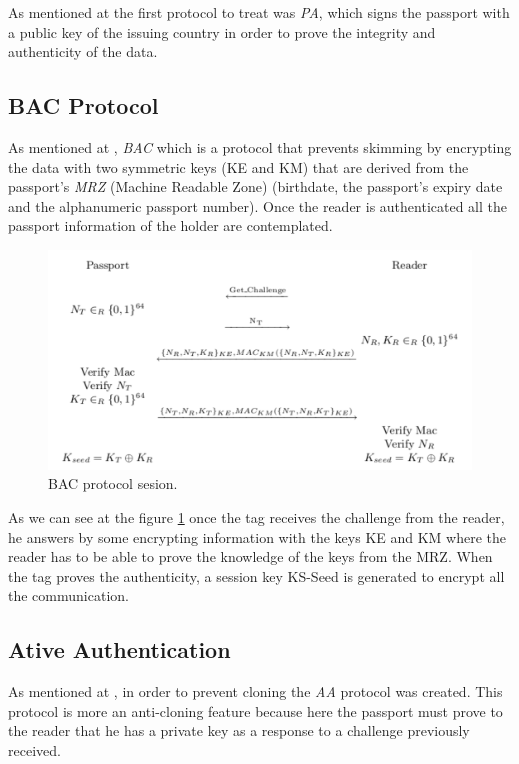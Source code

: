 \documentclass{acm_proc_article-sp}
\begin{document}
As mentioned at \cite{NM12} the first protocol to treat was \textit{PA}, which signs the passport with 
a public key of the issuing country in order to prove the integrity and authenticity of the data.

\subsection{BAC Protocol}
As mentioned at \cite{CLPS07}, \textit{BAC} which is a protocol that prevents skimming by encrypting 
the data with two symmetric keys (KE and KM) that are derived from the passport's  
\textit{MRZ} (Machine Readable Zone) (birthdate, the passport’s expiry date and the alphanumeric 
passport number). Once the reader is authenticated all the passport information of the holder are contemplated.

\begin{figure}
  \centering
  \includegraphics[scale=0.35]{BAC.pdf}
  \caption{BAC protocol sesion.}
  \label{fig:fig1}
\end{figure}

As we can see at the figure \ref{fig:fig1} once the tag receives the challenge from the reader, he answers 
by some encrypting information with the keys KE and KM where the reader has to be able to prove the 
knowledge of the keys from the MRZ. When the tag proves the authenticity, a session key KS-Seed 
is generated to encrypt all the communication.

\subsection{Ative Authentication}
As mentioned at \cite{JUAR2005}, in order to prevent cloning the \textit{AA} protocol was created. 
This protocol is more an anti-cloning feature because here the passport must prove 
to the reader that he has a private key as a response to a challenge previously received.
\end{document}
